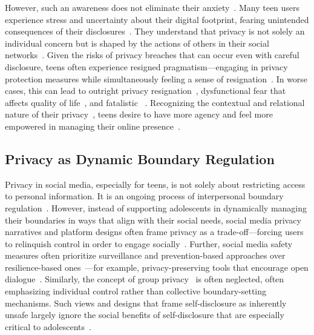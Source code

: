 However, such an awareness does not eliminate their anxiety~\cite{kim2025privacysocialnormsystematically}. Many teen users experience stress and uncertainty about their digital footprint, fearing unintended consequences of their disclosures~\cite{Williams2023-jm}. They understand that privacy is not solely an individual concern but is shaped by the actions of others in their social networks~\cite{marwick2014networked}. Given the risks of privacy breaches that can occur even with careful disclosure, teens often experience resigned pragmatism---engaging in privacy protection measures while simultaneously feeling a sense of resignation~\cite{Acquisti-2017-NudgesPrivacyOnline-y, Weinstein2022-rh}. In worse cases, this can lead to outright privacy resignation~\cite{Malkin-2022-RuntimePermissionsAssistants-p}, dysfunctional fear that affects quality of life~\cite{kim2025privacysocialnormsystematically}, and fatalistic ~\cite{de2020contextualizing}. Recognizing the contextual and relational nature of their privacy~\cite{zhao2022understanding}, teens desire to have more agency and feel more empowered in managing their online presence~\cite{kim2025privacysocialnormsystematically, kim2025socialmediaisntjust}. 


\subsection{Privacy as Dynamic Boundary Regulation}
Privacy in social media, especially for teens, is not solely about restricting access to personal information. It is an ongoing process of interpersonal boundary regulation~\cite{Page-2019-PragmaticToolFeatures-p, Barkhuus-2012-MismeasurementPrivacyHCI-d, DeWolf-2014-ManagingPrivacyFacebook-c}. However, instead of supporting adolescents in dynamically managing their boundaries in ways that align with their social needs, social media privacy narratives and platform designs often frame privacy as a trade-off---forcing users to relinquish control in order to engage socially~\cite{Wisniewski-2015-GiveSocialWant-z, Wisniewski-2016-FramingMeasuringUsers-w}. Further, social media safety measures often prioritize surveillance and prevention-based approaches over resilience-based ones~\cite{Wisniewski-2018-PrivacyParadox-l}---for example, privacy-preserving tools that encourage open dialogue~\cite{Chouhan-2019-Co-designingCommunityTogether-x}. Similarly, the concept of group privacy~\cite{Choksi-2024-PrivacyGroupsMatters-b} is often neglected, often emphasizing individual control rather than collective boundary-setting mechanisms. Such views and designs that frame self-disclosure as inherently unsafe largely ignore the social benefits of self-disclosure that are especially critical to adolescents~\cite{Davis2012-bq, Weinstein2022-rh}. 

